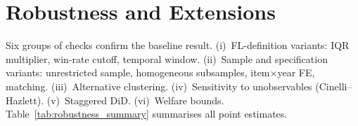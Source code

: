 \section{Robustness and Extensions}
\label{sec:robustness}

Six groups of checks confirm the baseline result. (i)~FL-definition
variants: IQR multiplier, win-rate cutoff, temporal window.
(ii)~Sample and specification variants: unrestricted sample,
homogeneous subsamples, item$\times$year FE, matching.
(iii)~Alternative clustering. (iv)~Sensitivity to unobservables
(Cinelli--Hazlett). (v)~Staggered DiD. (vi)~Welfare bounds.
Table~\ref{tab:robustness_summary} summarises all point estimates.

